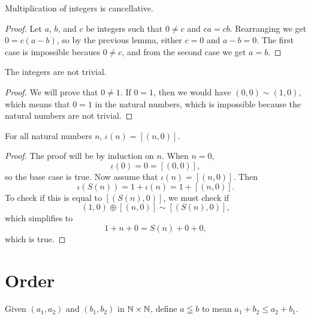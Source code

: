 \documentclass[../../math.tex]{subfiles}
\begin{document}
\begin{instance}
    Multiplication of integers is cancellative.
\end{instance}
\begin{proof}
    Let $a$, $b$, and $c$ be integers such that $0 \neq c$ and $ca = cb$.
    Rearranging we get $0 = c(a - b)$, so by the previous lemma, either $c = 0$
    and $a - b = 0$.  The first case is impossible becaues $0 \neq c$, and from
    the second case we get $a = b$.
\end{proof}

\begin{instance}
    The integers are not trivial.
\end{instance}
\begin{proof}
    We will prove that $0 \neq 1$.  If $0 = 1$, then we would have $(0, 0) \sim
    (1, 0)$, which means that $0 = 1$ in the natural numbers, which is
    impossible because the natural numbers are not trivial.
\end{proof}

\begin{theorem}
    For all natural numbers $n$, $\iota(n) = [(n, 0)]$.
\end{theorem}
\begin{proof}
    The proof will be by induction on $n$.  When $n = 0$,
    \[
        \iota(0) = 0 = [(0, 0)],
    \]
    so the base case is true.  Now assume that $\iota(n) = [(n, 0)]$.  Then
    \[
        \iota(S(n)) = 1 + \iota(n) = 1 + [(n, 0)].
    \]
    To check if this is equal to $[(S(n), 0)]$, we must check if
    \[
        (1, 0) \oplus [(n, 0)] \sim [(S(n), 0)],
    \]
    which simplifies to
    \[
        1 + n + 0 = S(n) + 0 + 0,
    \]
    which is true.
\end{proof}

\section{Order}

\begin{definition}
    Given $(a_1, a_2)$ and $(b_1, b_2)$ in $\mathbb{N} \times \mathbb{N}$, define $a \leqq b$ to
    mean $a_1 + b_2 \leq a_2 + b_1$.
\end{definition}
\end{document}
